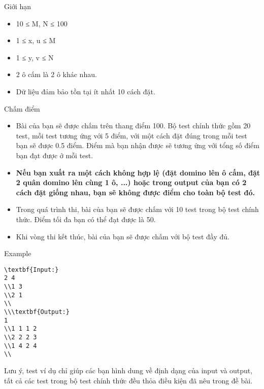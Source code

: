 Giới hạn
\begin{itemize}
	\item     10 ≤ M, N ≤ 100   
	\item     1 ≤ x, u ≤ M   
	\item     1 ≤ y, v ≤ N   
	\item     2 ô cấm là 2 ô khác nhau.   
	\item     Dữ liệu đảm bảo tồn tại ít nhất 10 cách đặt.   
\end{itemize}
Chấm điểm
\begin{itemize}
	\item     Bài của bạn sẽ được chấm trên thang điểm 100. Bộ test chính thức gồm 20 test, mỗi test tương ứng với 5 điểm, với một cách đặt đúng trong mỗi test bạn sẽ được 0.5 điểm. Điểm mà bạn nhận được sẽ tương ứng với tổng số điểm bạn đạt được ở mỗi test.   
	\item \textbf{     Nếu bạn xuất ra một cách không hợp lệ (đặt domino lên ô cấm, đặt 2  quân domino lên cùng 1 ô, ...) hoặc trong output của bạn có 2 cách đặt  giống nhau, bạn sẽ không được điểm cho toàn bộ test đó.    }
	\item     Trong quá trình thi, bài của bạn sẽ được chấm với 10 test trong bộ test chính thức. Điểm tối đa bạn có thể đạt được là 50.   
	\item     Khi vòng thi kết thúc, bài của bạn sẽ được chấm với bộ test đầy đủ.   
\end{itemize}
\begin{itemize}
\end{itemize}
\begin{itemize}
\end{itemize}
Example
\begin{verbatim}
\textbf{Input:}
2 4
\\1 3
\\2 1
\\
\\\textbf{Output:}
1
\\1 1 1 2
\\2 2 2 3
\\1 4 2 4
\\\end{verbatim}

   Lưu ý, test ví dụ chỉ giúp các bạn hình dung về định dạng của input và output, tất cả các test trong bộ test chính thức đều thỏa điều kiện đã nêu trong đề bài.